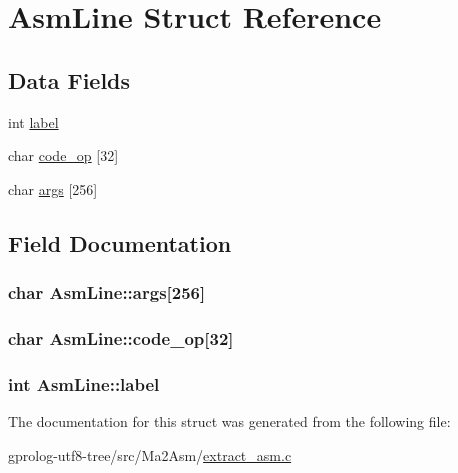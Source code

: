 \hypertarget{structAsmLine}{}\section{Asm\+Line Struct Reference}
\label{structAsmLine}
\subsection*{Data Fields}
\begin{DoxyCompactItemize}
\item 
int \hyperlink{structAsmLine_a1b7f8a7f299218d0be5d2e5e15bb974e}{label}
\item 
char \hyperlink{structAsmLine_af94ff4cc2a4abfdf5eed77061fd34f68}{code\+\_\+op} \mbox{[}32\mbox{]}
\item 
char \hyperlink{structAsmLine_a77453b03d07a24336adf4f62b5bbc9c8}{args} \mbox{[}256\mbox{]}
\end{DoxyCompactItemize}


\subsection{Field Documentation}
\subsubsection[{\texorpdfstring{args}{args}}]{\setlength{\rightskip}{0pt plus 5cm}char Asm\+Line\+::args\mbox{[}256\mbox{]}}\hypertarget{structAsmLine_a77453b03d07a24336adf4f62b5bbc9c8}{}\label{structAsmLine_a77453b03d07a24336adf4f62b5bbc9c8}
\subsubsection[{\texorpdfstring{code\+\_\+op}{code_op}}]{\setlength{\rightskip}{0pt plus 5cm}char Asm\+Line\+::code\+\_\+op\mbox{[}32\mbox{]}}\hypertarget{structAsmLine_af94ff4cc2a4abfdf5eed77061fd34f68}{}\label{structAsmLine_af94ff4cc2a4abfdf5eed77061fd34f68}
\subsubsection[{\texorpdfstring{label}{label}}]{\setlength{\rightskip}{0pt plus 5cm}int Asm\+Line\+::label}\hypertarget{structAsmLine_a1b7f8a7f299218d0be5d2e5e15bb974e}{}\label{structAsmLine_a1b7f8a7f299218d0be5d2e5e15bb974e}


The documentation for this struct was generated from the following file\+:\begin{DoxyCompactItemize}
\item 
gprolog-\/utf8-\/tree/src/\+Ma2\+Asm/\hyperlink{extract__asm_8c}{extract\+\_\+asm.\+c}\end{DoxyCompactItemize}
